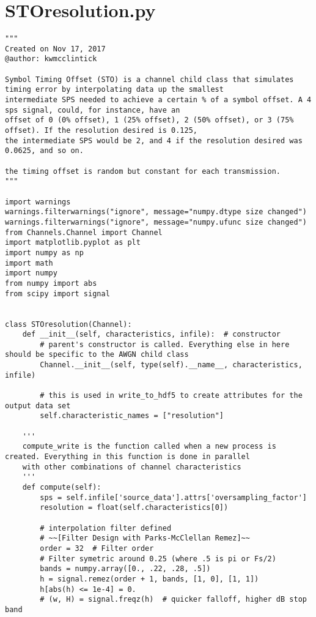 \section{STOresolution.py}
\begin{lstlisting}[breaklines]
"""
Created on Nov 17, 2017
@author: kwmcclintick

Symbol Timing Offset (STO) is a channel child class that simulates timing error by interpolating data up the smallest
intermediate SPS needed to achieve a certain % of a symbol offset. A 4 sps signal, could, for instance, have an
offset of 0 (0% offset), 1 (25% offset), 2 (50% offset), or 3 (75% offset). If the resolution desired is 0.125,
the intermediate SPS would be 2, and 4 if the resolution desired was 0.0625, and so on.

the timing offset is random but constant for each transmission.
"""

import warnings
warnings.filterwarnings("ignore", message="numpy.dtype size changed")
warnings.filterwarnings("ignore", message="numpy.ufunc size changed")
from Channels.Channel import Channel
import matplotlib.pyplot as plt
import numpy as np
import math
import numpy
from numpy import abs
from scipy import signal


class STOresolution(Channel):
    def __init__(self, characteristics, infile):  # constructor
        # parent's constructor is called. Everything else in here should be specific to the AWGN child class
        Channel.__init__(self, type(self).__name__, characteristics, infile)

        # this is used in write_to_hdf5 to create attributes for the output data set
        self.characteristic_names = ["resolution"]

    '''
    compute_write is the function called when a new process is created. Everything in this function is done in parallel
    with other combinations of channel characteristics
    '''
    def compute(self):
        sps = self.infile['source_data'].attrs['oversampling_factor']
        resolution = float(self.characteristics[0])

        # interpolation filter defined
        # ~~[Filter Design with Parks-McClellan Remez]~~
        order = 32  # Filter order
        # Filter symetric around 0.25 (where .5 is pi or Fs/2)
        bands = numpy.array([0., .22, .28, .5])
        h = signal.remez(order + 1, bands, [1, 0], [1, 1])
        h[abs(h) <= 1e-4] = 0.
        # (w, H) = signal.freqz(h)  # quicker falloff, higher dB stop band


\end{lstlisting}
